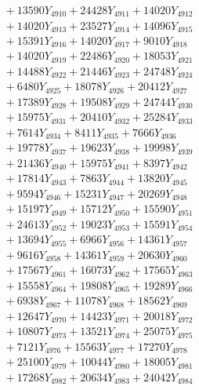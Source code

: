 \documentclass[a4paper,10pt]{article}
\begin{document}
{\begin{align}
&\;  + 13590 Y_{4910} + 24428 Y_{4911} + 14020 Y_{4912} \\[0.3ex]
&\;  + 14020 Y_{4913} + 23527 Y_{4914} + 14096 Y_{4915} \\[0.3ex]
&\;  + 15391 Y_{4916} + 14020 Y_{4917} + 9010 Y_{4918} \\[0.5ex]\allowbreak
&\;  + 14020 Y_{4919} + 22486 Y_{4920} + 18053 Y_{4921} \\[0.3ex]
&\;  + 14488 Y_{4922} + 21446 Y_{4923} + 24748 Y_{4924} \\[0.3ex]
&\;  + 6480 Y_{4925} + 18078 Y_{4926} + 20412 Y_{4927} \\[0.3ex]
&\;  + 17389 Y_{4928} + 19508 Y_{4929} + 24744 Y_{4930} \\[0.3ex]
&\;  + 15975 Y_{4931} + 20410 Y_{4932} + 25284 Y_{4933} \\[0.3ex]
&\;  + 7614 Y_{4934} + 8411 Y_{4935} + 7666 Y_{4936} \\[0.3ex]
&\;  + 19778 Y_{4937} + 19623 Y_{4938} + 19998 Y_{4939} \\[0.3ex]
&\;  + 21436 Y_{4940} + 15975 Y_{4941} + 8397 Y_{4942} \\[0.3ex]
&\;  + 17814 Y_{4943} + 7863 Y_{4944} + 13820 Y_{4945} \\[0.3ex]
&\;  + 9594 Y_{4946} + 15231 Y_{4947} + 20269 Y_{4948} \\[0.5ex]\allowbreak
&\;  + 15197 Y_{4949} + 15712 Y_{4950} + 15590 Y_{4951} \\[0.3ex]
&\;  + 24613 Y_{4952} + 19023 Y_{4953} + 15591 Y_{4954} \\[0.3ex]
&\;  + 13694 Y_{4955} + 6966 Y_{4956} + 14361 Y_{4957} \\[0.3ex]
&\;  + 9616 Y_{4958} + 14361 Y_{4959} + 20630 Y_{4960} \\[0.3ex]
&\;  + 17567 Y_{4961} + 16073 Y_{4962} + 17565 Y_{4963} \\[0.3ex]
&\;  + 15558 Y_{4964} + 19808 Y_{4965} + 19289 Y_{4966} \\[0.3ex]
&\;  + 6938 Y_{4967} + 11078 Y_{4968} + 18562 Y_{4969} \\[0.3ex]
&\;  + 12647 Y_{4970} + 14423 Y_{4971} + 20018 Y_{4972} \\[0.3ex]
&\;  + 10807 Y_{4973} + 13521 Y_{4974} + 25075 Y_{4975} \\[0.3ex]
&\;  + 7121 Y_{4976} + 15563 Y_{4977} + 17270 Y_{4978} \\[0.5ex]\allowbreak
&\;  + 25100 Y_{4979} + 10044 Y_{4980} + 18005 Y_{4981} \\[0.3ex]
&\;  + 17268 Y_{4982} + 20634 Y_{4983} + 24042 Y_{4984} \\[0.3ex]

\end{align}}
\end{document}
